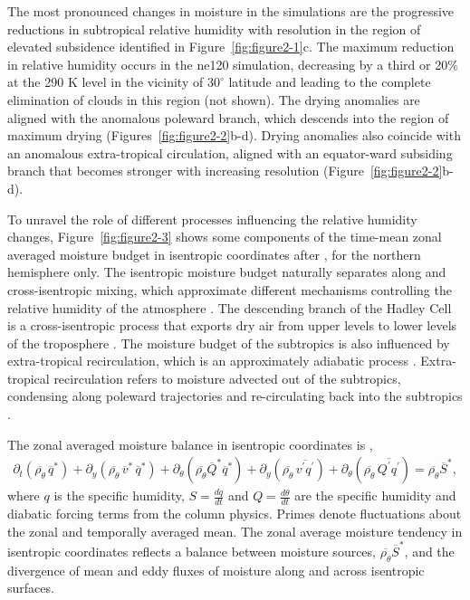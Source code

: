 The most pronounced changes in moisture in the simulations are the progressive reductions in subtropical relative humidity with resolution in the region of elevated subsidence identified in Figure~\ref{fig:figure2-1}c. The maximum reduction in relative humidity occurs in the ne120 simulation, decreasing by a third or 20\% at the 290 K level in the vicinity of $30^{\circ}$ latitude and leading to the complete elimination of clouds in this region (not shown). The drying anomalies are aligned with the anomalous poleward branch, which descends into the region of maximum drying (Figures~\ref{fig:figure2-2}b-d). Drying anomalies also coincide with an anomalous extra-tropical circulation, aligned with an equator-ward subsiding branch that becomes stronger with increasing resolution (Figure~\ref{fig:figure2-2}b-d).

To unravel the role of different processes influencing the relative humidity changes, Figure~\ref{fig:figure2-3} shows some components of the time-mean zonal averaged moisture budget in isentropic coordinates after \cite{SETAL2006JCLIM}, for the northern hemisphere only. The isentropic moisture budget naturally separates along and cross-isentropic mixing, which approximate different mechanisms controlling the relative humidity of the atmosphere \citep{SETAL2006JCLIM}. The descending branch of the Hadley Cell is a cross-isentropic process that exports dry air from upper levels to lower levels of the troposphere \citep{P1999GM}. The moisture budget of the subtropics is also influenced by extra-tropical recirculation, which is an approximately adiabatic process \citep{GETAL2005JAS,SETAL2006JCLIM}. Extra-tropical recirculation refers to moisture advected out of the subtropics, condensing along poleward trajectories and re-circulating back into the subtropics \citep{GETAL2005JAS}.

The zonal averaged moisture balance in isentropic coordinates is \citep{SETAL2006JCLIM},
\begin{eqnarray}
\partial_t (\overline{\rho_{\theta}} \, \overline{q}^{\ast}) + \partial_y (\overline{\rho_{\theta}} \, \overline{v}^{\ast} \, \overline{q}^{\ast}) + \partial_{\theta} (\overline{\rho_{\theta}} \overline{Q}^{\ast} \overline{q}^{\ast}) + \partial_y (\overline{\rho_{\theta}} \, \overline{v^{\prime} q^{\prime}}) + \partial_{\theta} (\overline{\rho_{\theta}} \, \overline{Q^{\prime} q^{\prime}}) = \overline{\rho_{\theta}} \overline{S}^{\ast}, \label{eq:eq2-6}
\end{eqnarray}
where $q$ is the specific humidity, $S = \frac{dq}{dt}$ and $Q = \frac{d \theta}{dt}$ are the specific humidity and diabatic forcing terms from the column physics. Primes denote fluctuations about the zonal and temporally averaged mean. The zonal average moisture tendency in isentropic coordinates reflects a balance between moisture sources, $\overline{\rho_{\theta}} \overline{S}^{\ast}$, and the divergence of mean and eddy fluxes of moisture along and across isentropic surfaces.

